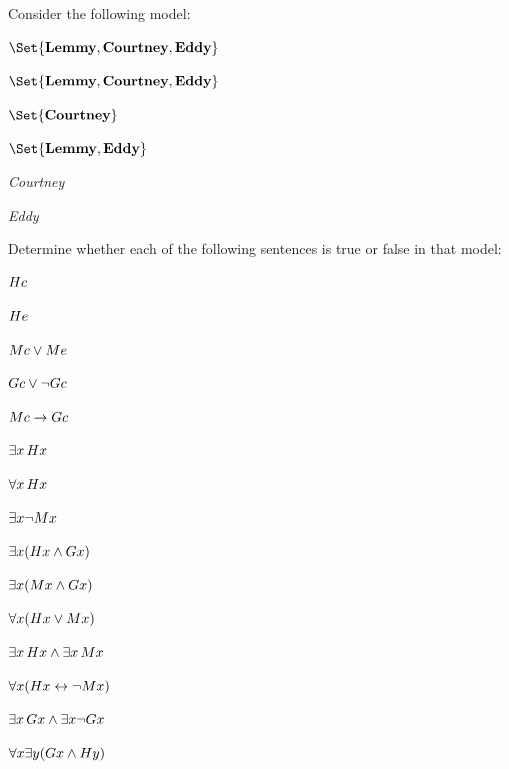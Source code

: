 \begin{practiceproblems}
	\problempart
	\label{pr:TorF2}
	Consider the following model:	
	\begin{interp}
		\item[\domain]$\Set{\emph{Lemmy}, \emph{Courtney}, \emph{Eddy}}$
		\item[\denote{G}] $\Set{\emph{Lemmy}, \emph{Courtney}, \emph{Eddy}}$
		\item[\denote{H}] $\Set{\emph{Courtney}}$
		\item[\denote{M}] $\Set{\emph{Lemmy}, \emph{Eddy}}$
		\item[\denote{c}] \emph{Courtney}
		\item[\denote{e}] \emph{Eddy}
	\end{interp}
	Determine whether each of the following sentences is true or false in that model:
	\begin{problemslist}
		\item $\mathord{H}c$ \hfill {}
		\item $\mathord{H}e$\hfill {}
		\item $\mathord{M}c \vee \mathord{M}e$ \hfill {}
		\item $\mathord{G}c \vee \neg \mathord{G}c$ \hfill {}
		\item $\mathord{M}c \rightarrow \mathord{G}c$ \hfill {}
		\item $\exists x\,\mathord{H}x$ \hfill {}
		\item $\forall x\,\mathord{H}x$ \hfill {}
		\item $\exists x \neg \mathord{M}x$ \hfill {}
		\item $\exists x(\mathord{H}x \mathbin{\wedge} \mathord{G}x)$ \hfill {}
		\item $\exists x(\mathord{M}x \mathbin{\wedge} \mathord{G}x)$ \hfill {}
		\item $\forall x(\mathord{H}x \vee \mathord{M}x)$ \hfill {}
		\item $\exists x\,\mathord{H}x \mathbin{\wedge} \exists x\,\mathord{M}x$ \hfill {}
		\item $\forall x(\mathord{H}x \leftrightarrow \neg \mathord{M}x)$ \hfill {}
		\item $\exists x\,\mathord{G}x \mathbin{\wedge} \exists x \neg \mathord{G}x$ \hfill {}
		\item $\forall x\exists y(\mathord{G}x \mathbin{\wedge} \mathord{H}y)$ \hfill {}
	\end{problemslist}
	

\end{practiceproblems}
